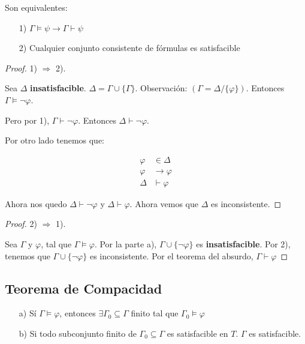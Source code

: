 \documentclass{amsart}
\begin{document}
\begin{ejercicio}
Son equivalentes:

\begin{enumerate}
	\item[1)] $\Gamma \models \psi \rightarrow \Gamma \vdash \psi$
	\item[2)] Cualquier conjunto consistente de f\'ormulas es satisfacible
\end{enumerate}


\begin{proof}
1) $\Rightarrow$ 2).

Sea $\Delta$ \textbf{insatisfacible}. $\Delta = \Gamma \cup	\{ \Gamma\}$. Observaci\'on: $(\Gamma = \Delta / \{ \varphi\})$. Entonces $\Gamma \models \neg \varphi$.

Pero por 1), $\Gamma \vdash \neg \varphi$. Entonces $\Delta \vdash \neg \varphi$.

Por otro lado tenemos que:

\begin{align*}
\varphi &\in \Delta	\\
\varphi &\rightarrow \varphi \\
\Delta &\vdash \varphi
\end{align*}

Ahora nos quedo $\Delta \vdash \neg \varphi$ y $\Delta \vdash \varphi$. Ahora vemos que $\Delta$ es inconsistente.
\end{proof}

\begin{proof}
2) $\Rightarrow$ 1).

Sea $\Gamma$ y $\varphi$, tal que $\Gamma \models \varphi$. Por la parte a), $\Gamma \cup \{ \neg \varphi\}$ es \textbf{insatisfacible}. Por 2), tenemos que $\Gamma \cup \{ \neg \varphi \}$ es inconsistente. Por el teorema del absurdo, $\Gamma \vdash \varphi$
\end{proof}

\end{ejercicio}

\subsection*{Teorema de Compacidad}

\begin{enumerate}
	\item[a)] S\'i $\Gamma \models \varphi$, entonces $\exists \Gamma_0 \subseteq \Gamma$ finito tal que $\Gamma_0 \models \varphi$
	
	\item[b)] Si todo subconjunto finito de $\Gamma_0 \subseteq \Gamma$ es satisfacible en $T$. $\Gamma$ es satisfacible.
\end{enumerate}
\end{document}
